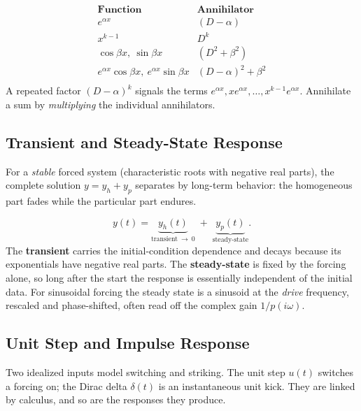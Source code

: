 \begin{formulabox}
\[
\begin{array}{l|l}
\textbf{Function} & \textbf{Annihilator} \\ \hline
e^{\alpha x} & (D-\alpha) \\
x^{k-1} & D^{k} \\
\cos\beta x,\ \sin\beta x & (D^2 + \beta^2) \\
e^{\alpha x}\cos\beta x,\ e^{\alpha x}\sin\beta x & (D-\alpha)^2 + \beta^2 \\
\end{array}
\]
A repeated factor $(D-\alpha)^k$ signals the terms
$e^{\alpha x}, x e^{\alpha x}, \ldots, x^{k-1}e^{\alpha x}$. Annihilate a sum by
\emph{multiplying} the individual annihilators.
\end{formulabox}

\subsection{Transient and Steady-State Response}

For a \emph{stable} forced system (characteristic roots with negative real
parts), the complete solution $y = y_h + y_p$ separates by long-term behavior: the
homogeneous part fades while the particular part endures.

\begin{formulabox}
\[ y(t) = \underbrace{y_h(t)}_{\text{transient}\ \to\ 0} \;+\; \underbrace{y_p(t)}_{\text{steady-state}}. \]
The \textbf{transient} carries the initial-condition dependence and decays because
its exponentials have negative real parts. The \textbf{steady-state} is fixed by
the forcing alone, so long after the start the response is essentially independent
of the initial data. For sinusoidal forcing the steady state is a sinusoid at the
\emph{drive} frequency, rescaled and phase-shifted, often read off the complex
gain $1/p(i\omega)$.
\end{formulabox}

\subsection{Unit Step and Impulse Response}

Two idealized inputs model switching and striking. The unit step $u(t)$ switches a
forcing on; the Dirac delta $\delta(t)$ is an instantaneous unit kick. They are
linked by calculus, and so are the responses they produce.

